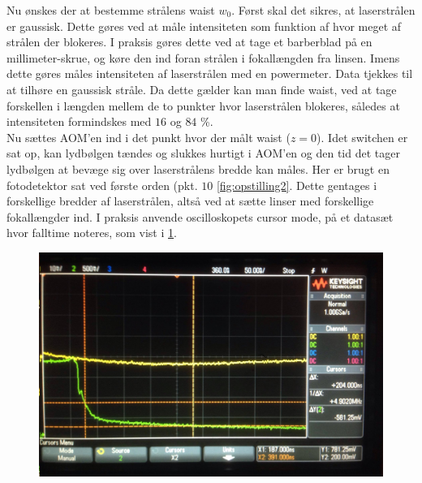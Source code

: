 \documentclass[main]{subfiles}
\begin{document}
Nu ønskes der at bestemme strålens waist $w_0$. Først skal det sikres, at laserstrålen er gaussisk. Dette gøres ved at måle intensiteten som funktion af hvor meget af strålen der blokeres. I praksis gøres dette ved at tage et barberblad på en millimeter-skrue, og køre den ind foran strålen i fokallængden fra linsen. Imens dette gøres måles intensiteten af laserstrålen med en powermeter. Data tjekkes til at tilhøre en gaussisk stråle. Da dette gælder kan man finde waist, ved at tage forskellen i længden mellem de to punkter hvor laserstrålen blokeres, således at  intensiteten formindskes med $16$ og $84$ \%.
\\ Nu sættes AOM'en ind i det punkt hvor der målt waist ($z=0$). Idet switchen er sat op, kan lydbølgen tændes og slukkes hurtigt i AOM'en og den tid det tager lydbølgen at bevæge sig over laserstrålens bredde kan måles. Her er brugt en fotodetektor sat ved første orden (pkt. $10$ \cref{fig:opstilling2}. Dette gentages i forskellige bredder af laserstrålen, altså ved at sætte linser med forskellige fokallængder ind. I praksis anvende oscilloskopets cursor mode, på et datasæt hvor falltime noteres, som vist i  \cref{fig:oscillo}.

\begin{figure}[H]
    \includegraphics[width=\linewidth]{tegninger/osciolo.png}
    \caption{}
    \label{fig:oscillo}
\end{figure}
\end{document}
